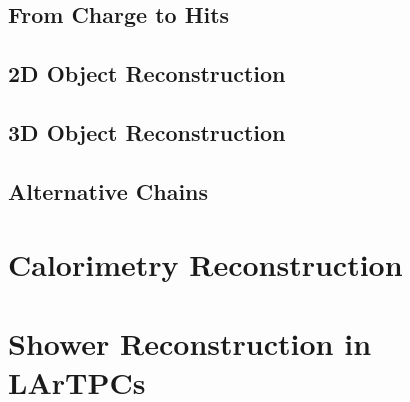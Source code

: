 \subsection{From Charge to Hits}\label{sec:HitReconstruction}

\subsection{2D Object Reconstruction}\label{sec:2DReconstruction}

\subsection{3D Object Reconstruction}\label{sec:3DReconstruction}

\subsection{Alternative Chains}\label{sec:AlternativeChains}

\section{Calorimetry Reconstruction}\label{sec:Calorimetry}

\section{Shower Reconstruction in LArTPCs}\label{sec:ShowerReconstruction}

